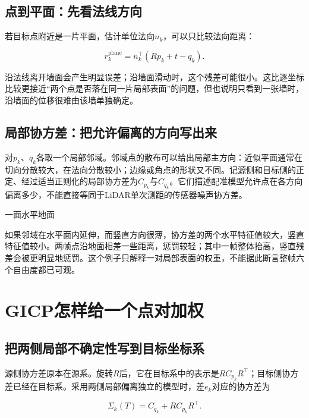 \subsection{点到平面：先看法线方向}

若目标点附近是一片平面，估计单位法向$n_k$，可以只比较法向距离：

\begin{equation*}
r_k^{\mathrm{plane}}=n_k^\top(Rp_k+t-q_k).
\end{equation*}

沿法线离开墙面会产生明显误差；沿墙面滑动时，这个残差可能很小。这比逐坐标比较更接近“两个点是否落在同一片局部表面”的问题，但也说明只看到一张墙时，沿墙面的位移很难由该墙单独确定。

\subsection{局部协方差：把允许偏离的方向写出来}

对$p_k$、$q_k$各取一个局部邻域。邻域点的散布可以给出局部主方向：近似平面通常在切向分散较大，在法向分散较小；边缘或角点的形状又不同。记源侧和目标侧的正定、经过适当正则化的局部协方差为$C_{p_k}$与$C_{q_k}$。它们描述配准模型允许点在各方向偏离多少，不能直接等同于LiDAR单次测距的传感器噪声协方差。

\begin{bookexample}{一面水平地面}

如果邻域在水平面内延伸，而竖直方向很薄，协方差的两个水平特征值较大，竖直特征值较小。两帧点沿地面相差一些距离，惩罚较轻；其中一帧整体抬高，竖直残差会被更明显地惩罚。这个例子只解释一对局部表面的权重，不能据此断言整帧六个自由度都已可观。

\end{bookexample}

\section{GICP怎样给一个点对加权}

\subsection{把两侧局部不确定性写到目标坐标系}

源侧协方差原本在源系。旋转$R$后，它在目标系中的表示是$RC_{p_k}R^\top$；目标侧协方差已经在目标系。采用两侧局部偏离独立的模型时，差$e_k$对应的协方差为

\begin{equation*}
\Sigma_k(T)=C_{q_k}+RC_{p_k}R^\top.
\end{equation*}


